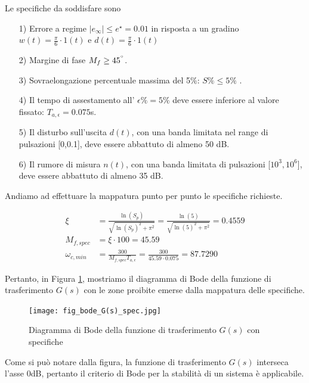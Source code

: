 \documentclass[a4paper, 11pt]{article}
\begin{document}
Le specifiche da soddisfare sono
\begin{itemize}
	\item[1)] Errore a regime $|e_{\infty}| \leq e^{\star} = 0.01$ in risposta a un gradino $w(t) = \frac{\pi}{6} \cdot 
 1(t) $ e $d(t)=  \frac{\pi}{6} \cdot 1(t)$ \\
	\item[2)] Margine di fase $M_f \geq 45^{\degree}$.\\
    \item[3)] Sovraelongazione percentuale massima del 5\%: $S \% \leq 5\% $ .\\
    \item[4)] Il tempo di assestamento all' $\epsilon \% = 5 \% $ deve essere inferiore al valore fissato: $T_{a, \epsilon} = 0.075$s.\\
	\item[5)] Il disturbo sull'uscita $d(t)$, con una banda limitata nel range di pulsazioni [0,0.1], deve essere abbattuto di almeno 50 dB.\\
	\item[6)] Il rumore di misura $n(t)$, con una banda limitata di pulsazioni [$10^3, 10^6$], deve essere abbattuto di almeno 35 dB.
\end{itemize}
%
Andiamo ad effettuare la mappatura punto per punto le specifiche richieste. 

%
\begin{subequations}\label{eq:spec}
\begin{align}
\xi &= \frac{\ln(S_p)}{\sqrt{\ln(S_p)^2 + \pi^2}} = \frac{\ln(5)}{\sqrt{\ln(5)^2 + \pi^2}} = 0.4559
\\
M_{f,spec} &= \xi \cdot 100 = 45.59 
\\ 
\omega_{c,min} &= \frac{300}{M_{f,spec} T_{a, \epsilon}} = \frac{300}{45.59 \cdot 0.075} = 87.7290
\end{align}
\end{subequations}
%

Pertanto, in Figura \ref{fig:bode2}, mostriamo il diagramma di Bode della funzione di trasferimento $G(s)$ con le zone proibite emerse dalla mappatura delle specifiche.

\begin{figure}[h]
\centering
\texttt{[image: fig\_bode\_G(s)\_spec.jpg]}
\caption{Diagramma di Bode della funzione di trasferimento $G(s)$ con specifiche}
\label{fig:bode2}
\end{figure}

Come si può notare dalla figura, la funzione di trasferimento $G(s)$ interseca l'asse 0dB, pertanto il criterio di Bode per la stabilità di un sistema è applicabile.
\end{document}
